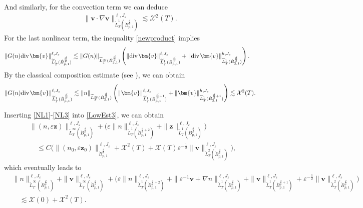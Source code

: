 \documentclass{amsart}
\theoremstyle{definition}
\theoremstyle{remark}
\numberwithin{equation}{section}
\def\dB{{\dot {B}}}
\renewcommand{\div}{\mbox{\rm div}\;\!}
\def\cX{{\mathcal X}}
\def\tL{\widetilde{L}}
\def\bz{{\bm{z} }}
\def\bv{{\bm{v} }}
\begin{document}
And similarly, for the convection term we can deduce
\begin{equation}\label{NL2}
\begin{split}
\|\bv\cdot \nabla \bv\|_{\tL_T^1(\dB_{p,1}^{\frac{d}{p}})}^{\ell,J_\varepsilon}
\lesssim
\cX^2(T).
\end{split}
\end{equation}
For the last nonlinear term, the inequality \eqref{newproduct} implies
\begin{equation*}
\begin{split}
\|G(n)\div \bv\|_{\tL_T^1(\dB_{p,1}^{\frac{d}{p}})}^{\ell,J_\varepsilon}
&\lesssim
\|G(n)\|_{\tL_T^\infty(\dB_{2,1}^{\frac{d}{2}})}
\left(\|\div \bv\|_{\tL_T^1(\dB_{p,1}^{\frac{d}{p}})}^{\ell,J_\varepsilon}
+ \|\div \bv\|_{\tL_T^1(\dB_{2,1}^{\frac{d}{2}})}^{h,J_\varepsilon}\right).
\end{split}
\end{equation*}
By the classical composition estimate (see \cite{chemin}), we can obtain
\begin{equation}\label{NL3}
\begin{split}
\|G(n)\div \bv\|_{\tL_T^1(\dB_{p,1}^{\frac{d}{p}})}^{\ell,J_\varepsilon}
\lesssim
\|n\|_{\tL_T^\infty(\dB_{2,1}^{\frac{d}{2}})}
\left(\|\bv\|_{\tL_T^1(\dB_{p,1}^{\frac{d}{p}+1})}^{\ell,J_\varepsilon} +\|\bv\|_{\tL_T^1(\dB_{2,1}^{\frac{d}{2}+1})}^{h,J_\varepsilon}\right)
\lesssim
\cX^2(T).
\end{split}
\end{equation}

Inserting \eqref{NL1}-\eqref{NL3} into \eqref{LowEst3}, we can obtain
\begin{equation*}
\begin{split}
&\|(n, \varepsilon \bz)\|_{\tL_T^\infty(\dot B_{p,1}^{\frac{d}{p}})}^{\ell,J_\varepsilon}
+\bigg(\varepsilon\|n\|_{\tL_T^1(\dot B_{p,1}^{\frac{d}{p}+2})}^{\ell,J_\varepsilon}
+\|\bz\|_{\tL_T^1(\dot B_{p,1}^{\frac{d}{p}})}^{\ell,J_\varepsilon}\bigg)\\
&\quad\leq C\bigg(
\|(n_0, \varepsilon \bz_0)\|_{\dot B_{p,1}^{\frac{d}{p}}}^{\ell,J_\varepsilon}
+\cX^2(T)+\cX(T)\varepsilon^{-\frac{1}{2}}
\|\bv\|_{\tL_T^2(\dB_{p,1}^{\frac{d}{p}})}^{\ell,J_\varepsilon}\bigg) ,
\end{split}
\end{equation*}
which eventually leads to
\begin{equation}\label{LowEst4}
\begin{split}
&\|n\|_{\tL_T^\infty(\dot B_{p,1}^{\frac{d}{p}})}^{\ell,J_\varepsilon}
+\|\bv\|_{\tL_T^\infty(\dot B_{p,1}^{\frac{d}{p}})}^{\ell,J_\varepsilon}
+\bigg(\varepsilon\|n\|_{\tL_T^1(\dot B_{p,1}^{\frac{d}{p}+2})}^{\ell,J_\varepsilon}+\|\varepsilon^{-1}\bv+\nabla n\|_{\tL_T^1(\dot B_{p,1}^{\frac{d}{p}})}^{\ell,J_\varepsilon}
+\|\bv\|_{\tL_T^1(\dot B_{p,1}^{\frac{d}{p}+1})}^{\ell,J_\varepsilon}
+\varepsilon^{-\frac{1}{2}}
\|\bv\|_{\tL_T^2(\dB_{p,1}^{\frac{d}{p}})}^{\ell,J_\varepsilon}\bigg)\\
&\quad\lesssim
\cX(0)+\cX^2(T).
\end{split}
\end{equation}
\end{document}
